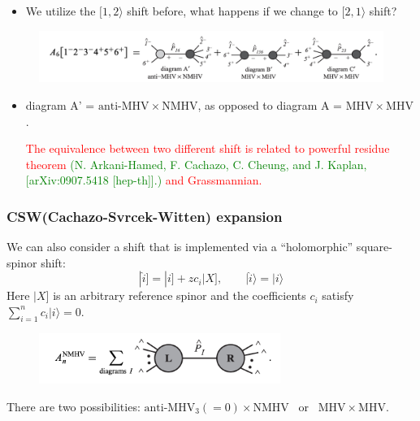 \documentclass{beamer}
\newcommand{\aket}[1]{|#1\rangle}
\newcommand{\sket}[1]{|#1]}
\begin{document}
\begin{frame}
    \begin{itemize}
        \item We utilize the $[1,2\rangle$ shift before, what happens if we change to $[2,1\rangle$ shift?
    \end{itemize}
    \begin{figure}
            \centering
            \includegraphics[width=1\textwidth]{6ptNMHV2.png}
        \end{figure}
    \begin{itemize}
        \item[] diagram A' = $\mathrm{anti\text{-}MHV} \times \mathrm{NMHV}$, as opposed to diagram A = $\mathrm{MHV}\times \mathrm{MHV}$. 
        \vspace{1em}

        \textcolor{red}{The equivalence between two different shift is related to powerful residue theorem} \textcolor{green}{(N. Arkani-Hamed, F. Cachazo, C. Cheung, and J. Kaplan, [arXiv:0907.5418 [hep-th]].)} \textcolor{red}{and Grassmannian.}
    \end{itemize}
\end{frame}
\begin{frame}
    \frametitle{CSW(Cachazo-Svrcek-Witten) expansion}
    We can also consider a shift that is implemented via a “holomorphic” square-spinor shift:
    \begin{equation*}
        \sket{\hat{i}}=\sket{i}+zc_i\sket{X},\qquad \aket{\hat{i}}=\aket{i}
    \end{equation*}
    Here $\sket{X}$ is an arbitrary reference spinor and the coefficients $c_i$ satisfy $\sum_{i=1}^{n} c_i \aket{i} = 0$.
    \begin{figure}
        \centering
        \includegraphics[width=0.7\textwidth]{NMHV.png}
    \end{figure}
    There are two possibilities: $\mathrm{anti\text{-}MHV_3}(=0)\times \mathrm{NMHV}$ ~or~ $\mathrm{MHV}\times\mathrm{MHV}$.
\end{frame}
\end{document}
